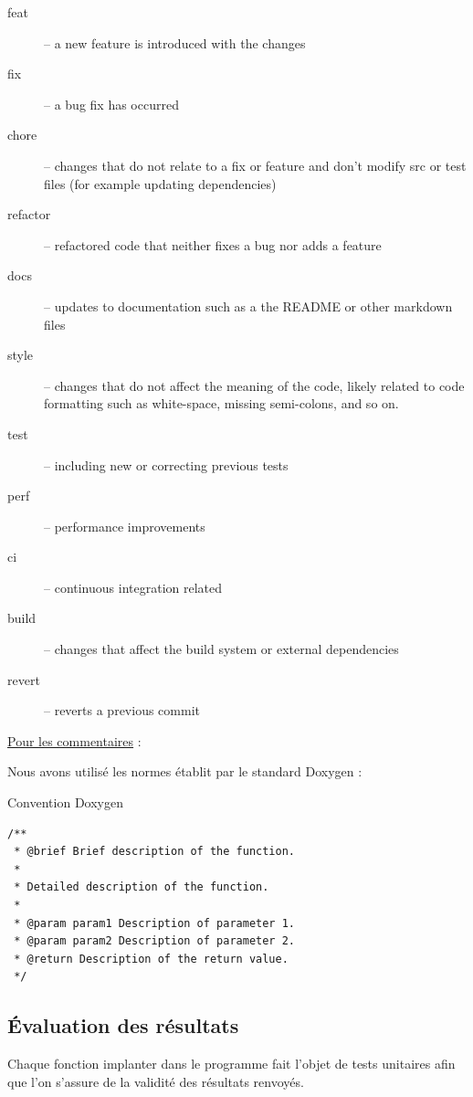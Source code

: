 \documentclass[a4paper, 12pt]{report}
\begin{document}
\begin{description}
    \item [feat] – a new feature is introduced with the changes
    \item [fix] – a bug fix has occurred
    \item [chore] – changes that do not relate to a fix or feature and don't modify src or test files (for example updating dependencies)
    \item [refactor] – refactored code that neither fixes a bug nor adds a feature
    \item [docs] – updates to documentation such as a the README or other markdown files
    \item [style] – changes that do not affect the meaning of the code, likely related to code formatting such as white-space, missing semi-colons, and so on.
    \item [test] – including new or correcting previous tests
    \item [perf] – performance improvements
    \item [ci] – continuous integration related
    \item [build] – changes that affect the build system or external dependencies
    \item [revert] – reverts a previous commit
\end{description}
\bigskip

\underline{Pour les commentaires} :
\bigskip

Nous avons utilisé les normes établit par le standard Doxygen :

\begin{longlisting}
    \caption{Convention Doxygen}
    \begin{verbatim}
/**
 * @brief Brief description of the function.
 *
 * Detailed description of the function.
 *
 * @param param1 Description of parameter 1.
 * @param param2 Description of parameter 2.
 * @return Description of the return value.
 */
    \end{verbatim}
\end{longlisting}


\subsection{Évaluation des résultats}

Chaque fonction implanter dans le programme fait l'objet de tests unitaires afin que l'on s'assure de la validité des résultats renvoyés.
\bigskip
\end{document}
